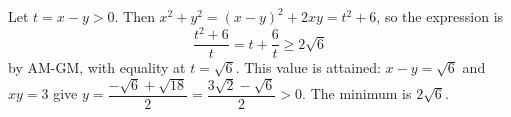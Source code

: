 Let $t=x-y>0$. Then $x^2+y^2=(x-y)^2+2xy=t^2+6$, so the expression is
\[
\dfrac{t^2+6}{t}=t+\dfrac{6}{t}\ge2\sqrt6
\]
by AM-GM, with equality at $t=\sqrt6$. This value is attained: $x-y=\sqrt6$ and $xy=3$ give $y=\dfrac{-\sqrt6+\sqrt{18}}{2}=\dfrac{3\sqrt2-\sqrt6}{2}>0$. The minimum is $\boxed{2\sqrt6}$.
